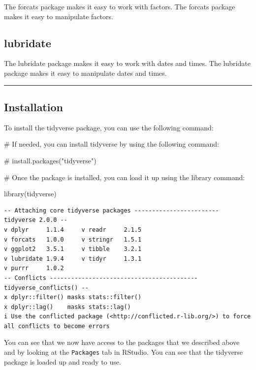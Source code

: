 \documentclass[
  letterpaper,
  DIV=11,
  numbers=noendperiod]{scrreprt}
\newenvironment{Shaded}{\begin{snugshade}}{\end{snugshade}}
\newcommand{\CommentTok}[1]{\textcolor[rgb]{0.37,0.37,0.37}{#1}}
\newcommand{\FunctionTok}[1]{\textcolor[rgb]{0.28,0.35,0.67}{#1}}
\newcommand{\NormalTok}[1]{\textcolor[rgb]{0.00,0.23,0.31}{#1}}
\begin{document}
The forcats package makes it easy to work with factors. The forcats
package makes it easy to manipulate factors.

\subsection*{lubridate}\label{lubridate}

The lubridate package makes it easy to work with dates and times. The
lubridate package makes it easy to manipulate dates and times.

\begin{center}\rule{0.5\linewidth}{0.5pt}\end{center}

\subsection*{Installation}\label{installation}

To install the tidyverse package, you can use the following command:

\begin{Shaded}
\begin{Highlighting}[]
\CommentTok{\# If needed, you can install tidyverse by using the following command:}

\CommentTok{\# install.packages("tidyverse")}

\CommentTok{\# Once the package is installed, you can load it up using the library command:}

\FunctionTok{library}\NormalTok{(tidyverse)}
\end{Highlighting}
\end{Shaded}

\begin{verbatim}
-- Attaching core tidyverse packages ------------------------ tidyverse 2.0.0 --
v dplyr     1.1.4     v readr     2.1.5
v forcats   1.0.0     v stringr   1.5.1
v ggplot2   3.5.1     v tibble    3.2.1
v lubridate 1.9.4     v tidyr     1.3.1
v purrr     1.0.2     
-- Conflicts ------------------------------------------ tidyverse_conflicts() --
x dplyr::filter() masks stats::filter()
x dplyr::lag()    masks stats::lag()
i Use the conflicted package (<http://conflicted.r-lib.org/>) to force all conflicts to become errors
\end{verbatim}

You can see that we now have access to the packages that we described
above and by looking at the \texttt{Packages} tab in RStudio. You can
see that the tidyverse package is loaded up and ready to use.
\end{document}

